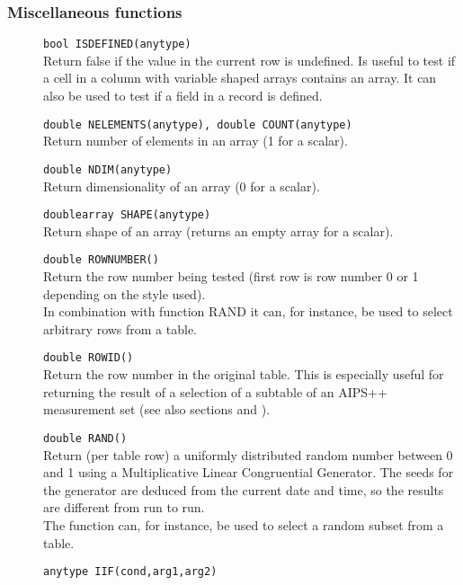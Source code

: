 \subsubsection{Miscellaneous functions}
\begin{description}
  \item[] \texttt{bool ISDEFINED(anytype)}\\
    Return false if the value in the current row is undefined. Is
    useful to test if a cell in a column with variable shaped arrays
    contains an array. It can also be used to test if a field in a
    record is defined.
  \item[] \texttt{double NELEMENTS(anytype), double COUNT(anytype)}\\
    Return number of elements in an array (1 for a scalar).
  \item[] \texttt{double NDIM(anytype)}\\
    Return dimensionality of an array (0 for a scalar).
  \item[] \texttt{doublearray SHAPE(anytype)}\\
    Return shape of an array (returns an empty array for a scalar).
  \item[] \texttt{double ROWNUMBER()}\\
    Return the row number being tested (first row is row number 0 or 1
    depending on the style used).
    \\In combination with function RAND it can, for instance,
    be used to select arbitrary rows from a table.
  \item[] \texttt{double ROWID()}\\
    Return the row number in the original table. This is especially
    useful for returning the result of a selection of a subtable
    of an AIPS++ measurement set
    (see also sections 
    and ).
  \item[] \texttt{double RAND()}\\
    Return (per table row) a uniformly distributed random number
    between 0 and 1 using a Multiplicative Linear Congruential Generator.
    The seeds for the generator are deduced from the current date and
    time, so the results are different from run to run.
    \\The function can, for instance, be used to select a random
    subset from a table.
  \item[] \texttt{anytype IIF(cond,arg1,arg2)}\\

\end{description}

